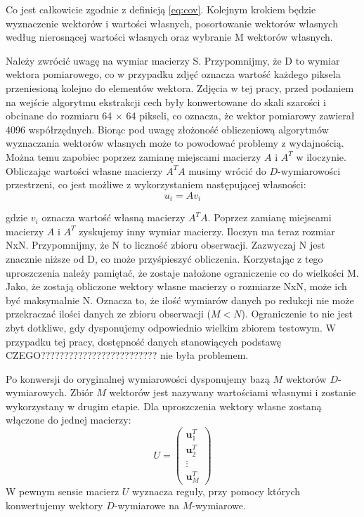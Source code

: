 \documentclass[oneside, eng]{mgr}
\newcommand{\bb}{\textbf}
\begin{document}
Co jest całkowicie zgodnie z definicją \ref{eq:cov}. Kolejnym krokiem będzie wyznaczenie wektorów i wartości własnych, posortowanie wektorów własnych według nierosnącej wartości własnych oraz wybranie M wektorów własnych. 

Należy zwrócić uwagę na wymiar macierzy S. Przypomnijmy, że D to wymiar wektora pomiarowego, co w przypadku zdjęć oznacza wartość każdego piksela przeniesioną kolejno do elementów wektora. Zdjęcia w tej pracy, przed podaniem na wejście algorytmu ekstrakcji cech były konwertowane do skali szarości i obcinane do rozmiaru 64 $\times$ 64 pikseli, co oznacza, że wektor pomiarowy zawierał 4096 współrzędnych. Biorąc pod uwagę złożoność obliczeniową algorytmów wyznaczania wektorów własnych może to powodować problemy z wydajnością. Można temu zapobiec poprzez zamianę miejscami macierzy $A$ i $A^T$ w iloczynie. Obliczając wartości własne macierzy $A^T A$ musimy wrócić do $D$-wymiarowości przestrzeni, co jest możliwe z wykorzystaniem następującej własności:
\begin{equation}
	u_i = A v_i
\end{equation}

gdzie $v_i$ oznacza wartość własną macierzy $A^T A$. Poprzez zamianę miejscami macierzy $A$ i $A^T$ zyskujemy inny wymiar macierzy. Iloczyn ma teraz rozmiar NxN. Przypomnijmy, że N to liczność zbioru obserwacji. Zazwyczaj N jest znacznie niższe od D, co może przyśpieszyć obliczenia. Korzystając z tego uproszczenia należy pamiętać, że zostaje nałożone ograniczenie co do wielkości M. Jako, że zostają obliczone wektory własne macierzy o rozmiarze NxN, może ich być maksymalnie N. Oznacza to, że ilość wymiarów danych po redukcji nie może przekraczać ilości danych ze zbioru obserwacji ($M < N$). Ograniczenie to nie jest zbyt dotkliwe, gdy dysponujemy odpowiednio wielkim zbiorem testowym. W przypadku tej pracy, dostępność danych stanowiących podstawę CZEGO????????????????????????? nie była problemem.

Po konwersji do oryginalnej wymiarowości dysponujemy bazą $M$ wektorów $D$-wymiarowych. Zbiór $M$ wektorów jest nazywany wartościami własnymi i zostanie wykorzystany w drugim etapie. Dla uproszczenia wektory własne zostaną włączone do jednej macierzy:
\begin{equation}
	U = 
	\left( \begin{array}{l}
		\bb{u}_1^T \\
		\bb{u}_2^T \\
		\vdots	 \\
		\bb{u}_M^T
	\end{array} \right)
\end{equation}
W pewnym sensie macierz $U$ wyznacza reguły, przy pomocy których konwertujemy wektory $D$-wymiarowe na $M$-wymiarowe.
\end{document}
